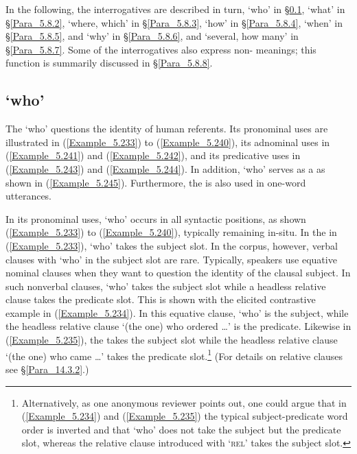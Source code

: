 In the following, the interrogatives are described in turn,  ‘who’ in §\ref{Para_5.8.1},  ‘what’ in §\ref{Para_5.8.2},  ‘where, which’ in §\ref{Para_5.8.3},  ‘how’ in §\ref{Para_5.8.4},  ‘when’ in §\ref{Para_5.8.5}, and  ‘why’ in §\ref{Para_5.8.6}, and   ‘several, how many’ in §\ref{Para_5.8.7}. Some of the interrogatives also express non-  meanings; this function is summarily discussed in §\ref{Para_5.8.8}.


\subsection{ ‘who’}
\label{Para_5.8.1}
The   ‘who’ questions the identity of human referents. Its pronominal uses are illustrated in (\ref{Example_5.233}) to (\ref{Example_5.240}), its adnominal uses in (\ref{Example_5.241}) and (\ref{Example_5.242}), and its predicative uses in (\ref{Example_5.243}) and (\ref{Example_5.244}). In addition,  ‘who’ serves as a  as shown in (\ref{Example_5.245}). Furthermore, the  is also used in one-word utterances.

In its pronominal uses,  ‘who’ occurs in all syntactic positions, as shown (\ref{Example_5.233}) to (\ref{Example_5.240}), typically remaining in-situ. In the  in (\ref{Example_5.233}),  ‘who’ takes the subject slot. In the corpus, however, verbal clauses with  ‘who’ in the subject slot are rare. Typically, speakers use equative nominal clauses when they want to question the identity of the clausal subject. In such nonverbal clauses,  ‘who’ takes the subject slot while a headless relative clause takes the predicate slot. This is shown with the elicited contrastive example in (\ref{Example_5.234}). In this equative clause,  ‘who’ is the subject, while the headless relative clause  ‘(the one) who ordered {\ldots}’ is the predicate. Likewise in (\ref{Example_5.235}), the  takes the subject slot while the headless relative clause  ‘(the one) who came {\ldots}’ takes the predicate slot.\footnote{\label{Footnote_5.168} Alternatively, as one anonymous reviewer points out, one could argue that in (\ref{Example_5.234}) and (\ref{Example_5.235}) the typical subject-predicate word order is inverted and that  ‘who’ does not take the subject but the predicate slot, whereas the relative clause introduced with  ‘\textsc{rel}’ takes the subject slot.
} (For details on relative clauses see §\ref{Para_14.3.2}.)


